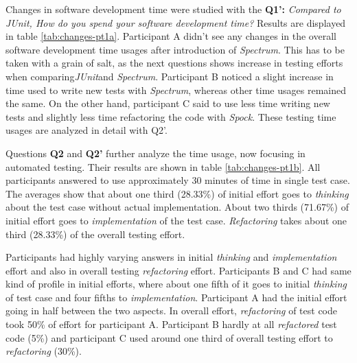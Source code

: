 Changes in software development time were studied with the \textbf{Q1':} \textit{Compared to \textit{JUnit}, How do you spend your
software development time?} Results are displayed in table \ref{tab:changes-pt1a}. Participant A
didn't see any changes in the overall software development time usages after introduction of \textit{Spectrum}. This has to be taken
with a grain of salt, as the  next questions shows increase in testing efforts when comparing\textit{JUnit}and \textit{Spectrum}.
Participant B noticed a slight increase in time used to write new tests with \textit{Spectrum}, whereas other time usages remained
the same. On the other hand, participant C said to use less time writing new tests and slightly less time refactoring the code with \textit{Spock}.
These testing time usages are analyzed in detail with Q2'.

Questions \textbf{Q2} and \textbf{Q2'} further analyze the time usage, now focusing in automated testing. Their results are
shown in table \ref{tab:changes-pt1b}. All participants answered to use approximately 30 minutes of time in single test case. The
averages show that about one third (28.33\%) of initial effort goes to \textit{thinking} about the test case without actual implementation.
About two thirds (71.67\%) of initial effort goes to \textit{implementation} of the test case. \textit{Refactoring} takes about one third (28.33\%)
of the overall testing effort.

Participants had highly varying answers in initial \textit{thinking} and \textit{implementation} effort and also
in overall testing \textit{refactoring} effort. Participants B and C had same kind of profile
in initial efforts, where about one fifth of it goes to initial \textit{thinking} of test case and four fifths to \textit{implementation}.
Participant A had the initial effort going in half between the two aspects. In overall effort,
\textit{refactoring} of test code took 50\% of effort for participant A. Participant B
hardly at all \textit{refactored} test code (5\%) and participant C used around one third of overall testing effort
to \textit{refactoring} (30\%).


